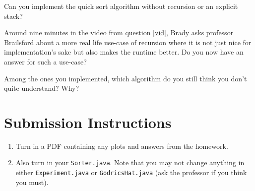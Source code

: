 \documentclass{homework}
\begin{document}
\question Can you implement the quick sort algorithm without recursion or an explicit stack?

\question Around nine minutes in the video from question \ref{vid}, Brady asks professor Brailsford about a more real life use-case of recursion where it is not just nice for implementation's sake but also makes the runtime better. Do you now have an answer for such a use-case?

\question Among the ones you implemented, which algorithm do you still think you don't quite understand? Why?

\section*{Submission Instructions}

\begin{enumerate}
    \item Turn in a PDF containing any plots and answers from the homework.
    \item Also turn in your \texttt{Sorter.java}. Note that you may not change anything in either \texttt{Experiment.java} or \texttt{GodricsHat.java} (ask the professor if you think you must). 
\end{enumerate}
\end{document}
